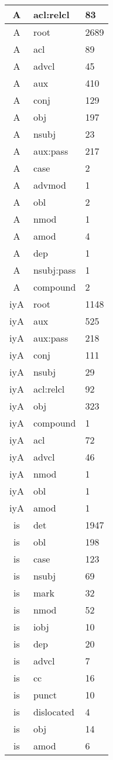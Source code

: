 \documentclass[a4 paper]{article}
\begin{document}
\begin{longtable}{cp{}p{}}
A & acl:relcl & 83\\ \midrule A & root & 2689\\ \midrule A & acl & 89\\ \midrule A & advcl & 45\\ \midrule A & aux & 410\\ \midrule A & conj & 129\\ \midrule A & obj & 197\\ \midrule A & nsubj & 23\\ \midrule A & aux:pass & 217\\ \midrule A & case & 2\\ \midrule A & advmod & 1\\ \midrule A & obl & 2\\ \midrule A & nmod & 1\\ \midrule A & amod & 4\\ \midrule A & dep & 1\\ \midrule A & nsubj:pass & 1\\ \midrule A & compound & 2\\ \midrule 
iyA & root & 1148\\ \midrule iyA & aux & 525\\ \midrule iyA & aux:pass & 218\\ \midrule iyA & conj & 111\\ \midrule iyA & nsubj & 29\\ \midrule iyA & acl:relcl & 92\\ \midrule iyA & obj & 323\\ \midrule iyA & compound & 1\\ \midrule iyA & acl & 72\\ \midrule iyA & advcl & 46\\ \midrule iyA & nmod & 1\\ \midrule iyA & obl & 1\\ \midrule iyA & amod & 1\\ \midrule 
is & det & 1947\\ \midrule is & obl & 198\\ \midrule is & case & 123\\ \midrule is & nsubj & 69\\ \midrule is & mark & 32\\ \midrule is & nmod & 52\\ \midrule is & iobj & 10\\ \midrule is & dep & 20\\ \midrule is & advcl & 7\\ \midrule is & cc & 16\\ \midrule is & punct & 10\\ \midrule is & dislocated & 4\\ \midrule is & obj & 14\\ \midrule is & amod & 6\\ \midrule 

\end{longtable}
\end{document}
